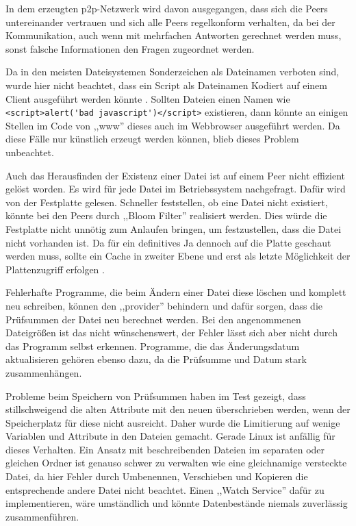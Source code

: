 \documentclass[oneside, ngerman, toc=bibliography,bibliography=totoc,listof=entryprefix, open=right,numbers=noenddot,fontsize=12pt]{scrbook}
\begin{document}
In dem erzeugten \acrshort{p2p}-Netzwerk wird davon ausgegangen, dass sich die Peers untereinander vertrauen und sich alle Peers regelkonform verhalten, da bei der Kommunikation, auch wenn mit mehrfachen Antworten gerechnet werden muss, sonst falsche Informationen den Fragen zugeordnet werden.

Da in den meisten Dateisystemen Sonderzeichen als Dateinamen verboten sind, wurde hier nicht beachtet, dass ein Script als Dateinamen Kodiert auf einem Client ausgeführt werden könnte \cite{winforbit}. Sollten Dateien einen Namen wie \verb|<script>alert('bad javascript')</script>| existieren, dann könnte an einigen Stellen im Code von ,,www'' dieses auch im Webbrowser ausgeführt werden. Da diese Fälle nur künstlich erzeugt werden können, blieb dieses Problem unbeachtet.

Auch das Herausfinden der Existenz einer Datei ist auf einem Peer nicht effizient gelöst worden.
Es wird für jede Datei im Betriebssystem nachgefragt. Dafür wird von der Festplatte gelesen.
Schneller feststellen, ob eine Datei nicht existiert, könnte bei den Peers durch ,,Bloom Filter'' realisiert werden. Dies würde die Festplatte nicht unnötig  zum Anlaufen bringen, um festzustellen, dass die Datei nicht vorhanden ist. Da für ein definitives Ja dennoch auf die Platte geschaut werden muss, sollte ein Cache in zweiter Ebene und erst als letzte Möglichkeit der Plattenzugriff erfolgen \cite{bejeck2013getting}.  

Fehlerhafte Programme, die beim Ändern einer Datei diese löschen und komplett neu schreiben, können den ,,provider'' behindern und dafür sorgen, dass die Prüfsummen der Datei neu berechnet werden. Bei den angenommenen Dateigrößen ist das nicht wünschenswert, der Fehler lässt sich aber nicht durch das Programm selbst erkennen. Programme, die das Änderungsdatum aktualisieren gehören ebenso dazu, da die Prüfsumme und Datum stark zusammenhängen.

Probleme beim Speichern von Prüfsummen haben im Test gezeigt, dass stillschweigend die alten Attribute mit den neuen überschrieben werden, wenn der Speicherplatz für diese nicht ausreicht. Daher wurde die Limitierung auf wenige Variablen und Attribute in den Dateien gemacht. Gerade Linux ist anfällig für dieses Verhalten.
Ein Ansatz mit beschreibenden Dateien im separaten oder gleichen Ordner ist genauso schwer zu verwalten wie eine gleichnamige versteckte Datei, da hier Fehler durch Umbenennen, Verschieben und Kopieren die entsprechende andere Datei nicht beachtet. Einen ,,Watch Service'' dafür zu implementieren, wäre umständlich und könnte Datenbestände niemals zuverlässig zusammenführen.
\end{document}

